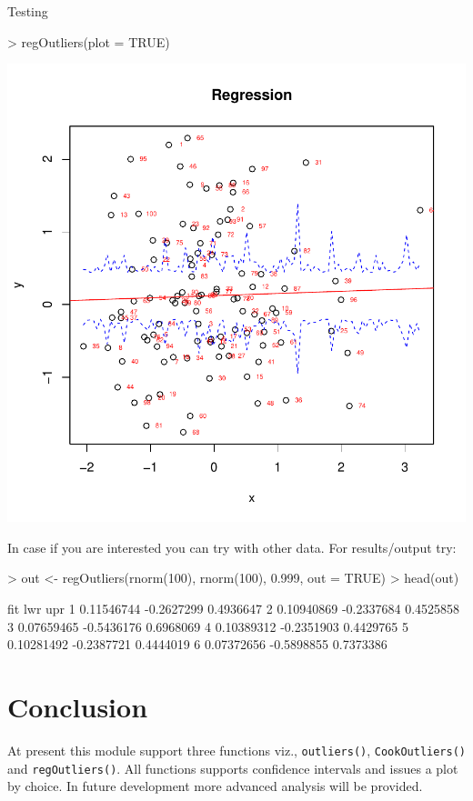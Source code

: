 \documentclass{article}
\begin{document}
Testing 

\begin{Schunk}
\begin{Sinput}
> regOutliers(plot = TRUE)
\end{Sinput}
\end{Schunk}
\includegraphics{anadetect-019}

In case if you are interested you can try with other data. For results/output try:

\begin{Schunk}
\begin{Sinput}
> out <- regOutliers(rnorm(100), rnorm(100), 0.999, out = TRUE)
> head(out)
\end{Sinput}
\begin{Soutput}
         fit        lwr       upr
1 0.11546744 -0.2627299 0.4936647
2 0.10940869 -0.2337684 0.4525858
3 0.07659465 -0.5436176 0.6968069
4 0.10389312 -0.2351903 0.4429765
5 0.10281492 -0.2387721 0.4444019
6 0.07372656 -0.5898855 0.7373386
\end{Soutput}
\end{Schunk}

\section{Conclusion}

At present this module support three functions viz., \texttt{outliers()}, \texttt{CookOutliers()} and \texttt{regOutliers()}. All functions supports confidence intervals and issues a plot by choice. In future development more advanced analysis will be provided. 
\end{document}
